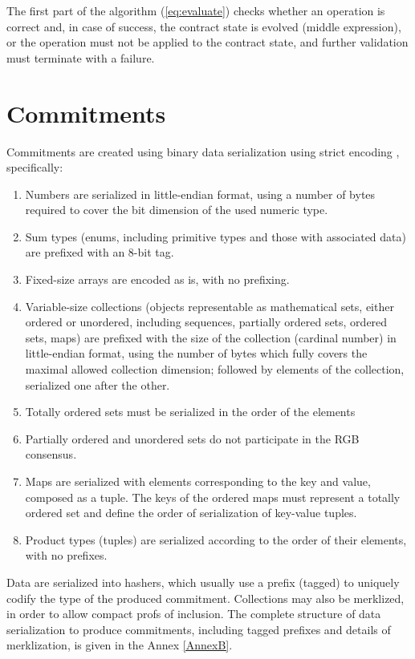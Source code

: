 \documentclass[9pt,oneside]{amsart}
\begin{document}
\begin{multicols}{2}
The first part of the algorithm (\ref{eq:evaluate}) checks whether an operation is correct and, in case of success,
the contract state is evolved (middle expression), or the operation must not be applied to the contract state,
and further validation must terminate with a failure.

\section{Commitments}\label{Commitments}

Commitments are created using binary data serialization using strict encoding \cite{strict}, specifically:
\begin{enumerate}
\item Numbers are serialized in little-endian format,
   using a number of bytes required to cover the bit dimension of the used numeric type.
\item Sum types (enums, including primitive types and those with associated data)
   are prefixed with an 8-bit tag.
\item Fixed-size arrays are encoded as is, with no prefixing.
\item Variable-size collections (objects representable as mathematical sets,
   either ordered or unordered, including sequences, partially ordered sets, ordered sets, maps)
   are prefixed with the size of the collection (cardinal number) in little-endian format,
   using the number of bytes which fully covers the maximal allowed collection dimension;
   followed by elements of the collection, serialized one after the other.
\item Totally ordered sets must be serialized in the order of the elements
\item Partially ordered and unordered sets do not participate in the RGB consensus.
\item Maps are serialized with elements corresponding to the key and value, composed as a tuple.
   The keys of the ordered maps must represent a totally ordered set
   and define the order of serialization of key-value tuples.
\item Product types (tuples) are serialized according to the order of their elements, with no prefixes.
\end{enumerate}

Data are serialized into hashers, which usually use a prefix (tagged) to uniquely codify
the type of the produced commitment. Collections may also be merklized, in order to allow
compact profs of inclusion. The complete structure of data serialization to produce commitments,
including tagged prefixes and details of merklization, is given in the Annex \ref{AnnexB}.



\end{multicols}
\end{document}

